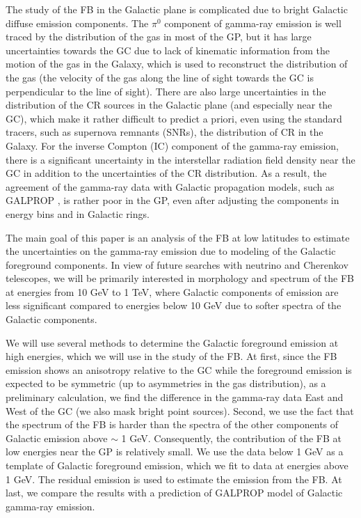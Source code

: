 The study of the FB in the Galactic plane is complicated due to bright Galactic diffuse emission components.
The $\pi^0$ component of gamma-ray emission is well traced by the distribution of the gas in most of the GP,
but it has large uncertainties towards the GC due to lack of kinematic information from the motion of the gas in the 
Galaxy, which is used to reconstruct the distribution of the gas
(the velocity of the gas along the line of sight towards the GC is perpendicular to the line of sight).
There are also large uncertainties in the distribution of the CR sources in the Galactic plane (and especially near the GC),
which make it rather difficult to predict a priori, even using the standard tracers, such as supernova remnants (SNRs), the distribution
of CR in the Galaxy.
For the inverse Compton (IC) component of the gamma-ray emission, 
there is a significant uncertainty in the interstellar radiation field density near the GC \citep[e.g.,][]{2017ApJ...846...67P} in addition to 
the uncertainties of the CR distribution.
As a result, the agreement of the gamma-ray data with Galactic propagation models, such as GALPROP \citep{2007ARNPS..57..285S}, 
is rather poor in the GP, even after adjusting the components in energy bins and in Galactic rings.

The main goal of this paper is an analysis of the FB at low latitudes to estimate the uncertainties on the gamma-ray 
emission due to modeling of the Galactic foreground components.
In view of future searches with neutrino and Cherenkov telescopes, 
we will be primarily interested in morphology and spectrum of the FB at energies from 10 GeV to 1 TeV,
where Galactic components of emission are less significant compared to energies below 10 GeV due to softer 
spectra of the Galactic components.

We will use several methods to determine the Galactic foreground emission at high energies,
which we will use in the study of the FB.
At first, since the FB emission shows an anisotropy relative to the GC
while the foreground emission is expected to be symmetric (up to asymmetries in the gas distribution),
as a preliminary calculation, we find the difference in the gamma-ray data East and West of the GC 
(we also mask bright point sources).
Second, we use the fact that the spectrum of the FB is harder than the spectra of the other components of Galactic emission
above $\sim$ 1 GeV.
Consequently, the contribution of the FB at low energies near the GP is relatively small. 
We use the data below 1 GeV as a template of Galactic foreground emission, 
which we fit to data at energies above 1 GeV.
The residual emission is used to estimate the emission from the FB.
At last, we compare the results with a prediction of GALPROP model of Galactic gamma-ray emission.





